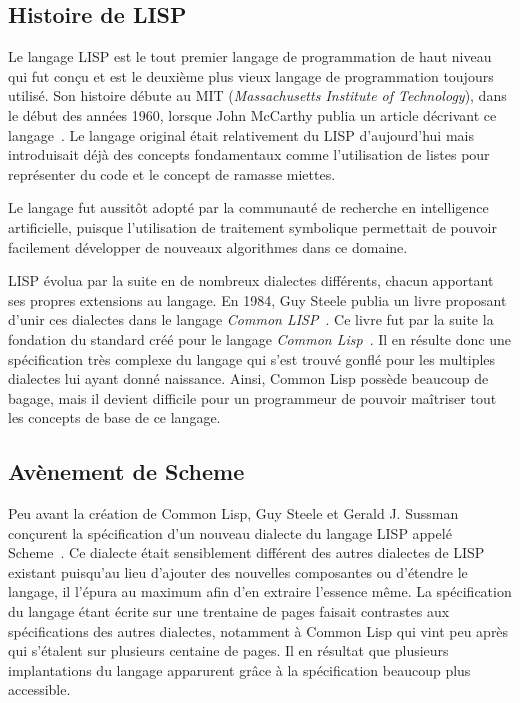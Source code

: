 \documentclass[12pt,oneside,letterpaper,francais]{book}
\begin{document}
\subsection{Histoire de LISP}
Le langage LISP est le tout premier langage de programmation de haut
niveau qui fut conçu et est le deuxième plus vieux langage de
programmation toujours utilisé. Son histoire débute au MIT
(\textit{Massachusetts Institute of Technology}), dans le début des
années 1960, lorsque John McCarthy publia un article décrivant ce
langage~\cite{LISP_ORIGINS}. Le langage original était relativement
du LISP d'aujourd'hui mais introduisait déjà des concepts fondamentaux
comme l'utilisation de listes pour représenter du code et le concept
de ramasse miettes.

Le langage fut aussitôt adopté par la communauté de recherche en
intelligence artificielle, puisque l'utilisation de traitement
symbolique permettait de pouvoir facilement développer de nouveaux
algorithmes dans ce domaine.

LISP évolua par la suite en de nombreux dialectes différents, chacun
apportant ses propres extensions au langage. En 1984, Guy Steele
publia un livre proposant d'unir ces dialectes dans le langage
\textit{Common LISP}~\cite{CLISP}. Ce livre fut par la suite la
fondation du standard créé pour le langage \textit{Common
  Lisp}~\cite{ANSI_CLISP}. Il en résulte donc une spécification très
complexe du langage qui s'est trouvé gonflé pour les multiples
dialectes lui ayant donné naissance. Ainsi, Common Lisp possède
beaucoup de bagage, mais il devient difficile pour un programmeur de
pouvoir maîtriser tout les concepts de base de ce langage.

\subsection{Avènement de Scheme}
Peu avant la création de Common Lisp, Guy Steele et Gerald J. Sussman
conçurent la spécification d'un nouveau dialecte du langage LISP
appelé Scheme~\cite{SCHEME_ORIGINS}. Ce dialecte était sensiblement
différent des autres dialectes de LISP existant puisqu'au lieu
d'ajouter des nouvelles composantes ou d'étendre le langage, il
l'épura au maximum afin d'en extraire l'essence même. La spécification
du langage étant écrite sur une trentaine de pages faisait contrastes
aux spécifications des autres dialectes, notamment à Common Lisp qui
vint peu après qui s'étalent sur plusieurs centaine de pages. Il en
résultat que plusieurs implantations du langage apparurent grâce à la
spécification beaucoup plus accessible.
\end{document}
